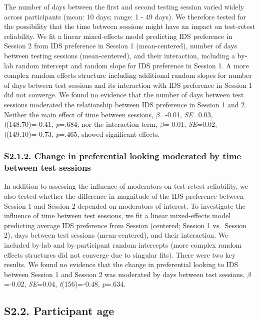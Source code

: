 \documentclass[
  man, donotrepeattitle,floatsintext]{apa6}
\begin{document}
The number of days between the first and second testing session varied widely across participants (mean: 10 days; range: 1 - 49 days). We therefore tested for the possibility that the time between sessions might have an impact on test-retest reliability. We fit a linear mixed-effects model predicting IDS preference in Session 2 from IDS preference in Session 1 (mean-centered), number of days between testing sessions (mean-centered), and their interaction, including a by-lab random intercept and random slope for IDS preference in Session 1.
A more complex random effects structure including additional random slopes for number of days between test sessions and its interaction with IDS preference in Session 1 did not converge.
We found no evidence that the number of days between test sessions moderated the relationship between IDS preference in Session 1 and 2. Neither the main effect of time between sessions, \(\beta\)=-0.01, \emph{SE}=0.03, \emph{t}(148.70)=-0.41, \emph{p}=.684, nor the interaction term, \(\beta\)=-0.01, \emph{SE}=0.02, \emph{t}(149.10)=-0.73, \emph{p}=.465, showed significant effects.

\hypertarget{s2.1.2.-change-in-preferential-looking-moderated-by-time-between-test-sessions}{%
\subsubsection{S2.1.2. Change in preferential looking moderated by time between test sessions}\label{s2.1.2.-change-in-preferential-looking-moderated-by-time-between-test-sessions}}

In addition to assessing the influence of moderators on test-retest reliability, we also tested whether the difference in magnitude of the IDS preference between Session 1 and Session 2 depended on moderators of interest.
To investigate the influence of time between test sessions, we fit a linear mixed-effects model predicting average IDS preference from Session (centered; Session 1 vs.~Session 2), days between test sessions (mean-centered), and their interaction.
We included by-lab and by-participant random intercepts (more complex random effects structures did not converge due to singular fits).
There were two key results.
We found no evidence that the change in preferential looking to IDS between Session 1 and Session 2 was moderated by days between test sessions, \(\beta\)=-0.02, \emph{SE}=0.04, \emph{t}(156)=-0.48, \emph{p}=.634.

\hypertarget{s2.2.-participant-age}{%
\subsection{S2.2. Participant age}\label{s2.2.-participant-age}}
\end{document}
